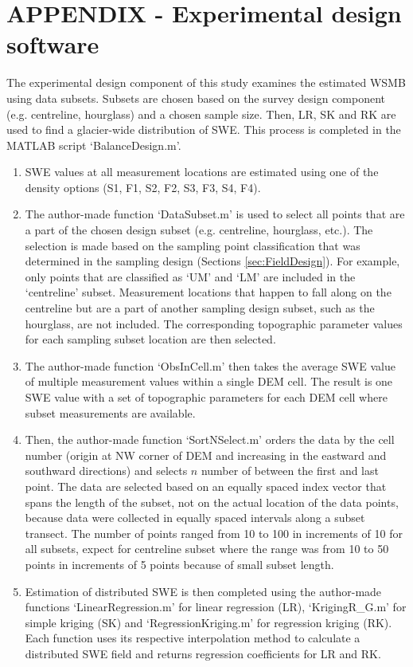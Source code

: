 \documentclass[12pt]{article}
\begin{document}



\section*{APPENDIX - Experimental design software}
\label{app:Subsets}
The experimental design component of this study examines the estimated WSMB using data subsets. Subsets are chosen based on the survey design component (e.g. centreline, hourglass) and a chosen sample size. Then, LR, SK and RK are used to find a glacier-wide distribution of SWE. This process is completed in the MATLAB script `BalanceDesign.m'. 
\begin{enumerate}
\item SWE values at all measurement locations are estimated using one of the density options (S1, F1, S2, F2, S3, F3, S4, F4).
\item The author-made function `DataSubset.m' is used to select all points that are a part of the chosen design subset (e.g. centreline, hourglass, etc.). The selection is made based on the sampling point classification that was determined in the sampling design (Sections \ref{sec:FieldDesign}). For example, only points that are classified as `UM' and `LM' are included in the `centreline' subset. Measurement locations that happen to fall along on the centreline but are a part of another sampling design subset, such as the hourglass, are not included. The corresponding topographic parameter values for each sampling subset location are then selected. 
\item The author-made function `ObsInCell.m' then takes the average SWE value of multiple measurement values within a single DEM cell. The result is one SWE value with a set of topographic parameters for each DEM cell where subset measurements are available.
\item Then, the author-made function `SortNSelect.m' orders the data by the cell number (origin at NW corner of DEM and increasing in the eastward and southward directions) and selects $n$ number of between the first and last point. The data are selected based on an equally spaced index vector that spans the length of the subset, not on the actual location of the data points, because data were collected in equally spaced intervals along a subset transect. The number of points ranged from 10 to 100 in increments of 10 for all subsets, expect for centreline subset where the range was from 10 to 50 points in increments of 5 points because of small subset length. 
\item Estimation of distributed SWE is then completed using the author-made functions `LinearRegression.m' for linear regression (LR), `KrigingR\_G.m' for simple kriging (SK) and `RegressionKriging.m' for regression kriging (RK). Each function uses its respective interpolation method to calculate a distributed SWE field and returns regression coefficients for LR and RK. 
\end{enumerate}
\end{document}
